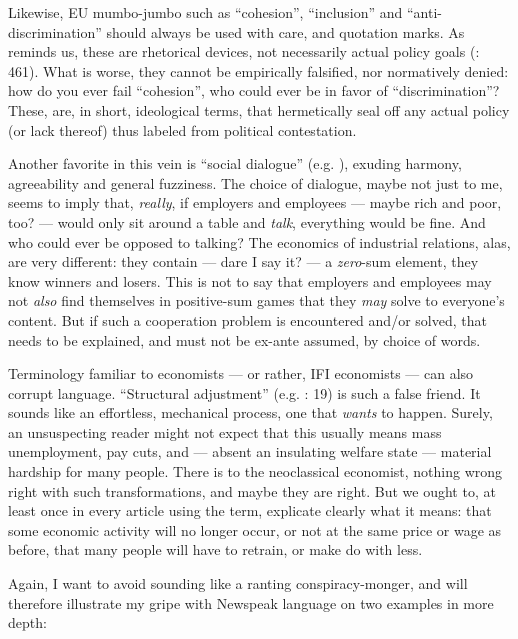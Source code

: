 \documentclass[11pt,a4paper,oneside,openright]{article}
\begin{document}
Likewise, \gls{EU} mumbo-jumbo such as ``cohesion'', ``inclusion'' and ``anti-discrimination'' should always be used with care, and quotation marks. 
As \citeauthor{Offe2003} reminds us, these are rhetorical devices, not necessarily actual policy goals (\citeyear{Offe2003}: 461). 
What is worse, they cannot be empirically falsified, nor normatively denied: 
how do you ever fail ``cohesion'', who could ever be in favor of ``discrimination''? 
These, are, in short, ideological terms, that hermetically seal off any actual policy (or lack thereof) thus labeled from political contestation.

Another favorite in this vein is ``social dialogue'' (e.g. \citealt{Durr2009}), exuding harmony, agreeability and general fuzziness. 
The choice of dialogue, maybe not just to me, seems to imply that, \emph{really}, if employers and employees --- maybe rich and poor, too? --- would only sit around a table and \emph{talk}, everything would be fine. 
And who could ever be opposed to talking? 
The economics of industrial relations, alas, are very different: 
they contain --- dare I say it? --- a \emph{zero}-sum element, they know winners and losers. 
This is not to say that employers and employees may not \emph{also} find themselves in positive-sum games that they \emph{may} solve to everyone's content. 
But if such a cooperation problem is encountered and/or solved, that needs to be explained, and must not be ex-ante assumed, by choice of words.

Terminology familiar to economists --- or rather, \gls{IFI} economists --- can also corrupt language. 
``Structural adjustment'' (e.g. \citealt{Begg2008}: 19) is such a false friend. 
It sounds like an effortless, mechanical process, one that \emph{wants} to happen. 
Surely, an unsuspecting reader might not expect that this usually means mass unemployment, pay cuts, and --- absent an insulating welfare state --- material hardship for many people. 
There is to the neoclassical economist, nothing wrong right with such transformations, and maybe they are right. 
But we ought to, at least once in every article using the term, explicate clearly what it means: 
that some economic activity will no longer occur, or not at the same price or wage as before, that many people will have to retrain, or make do with less.

Again, I want to avoid sounding like a ranting conspiracy-monger, and will therefore illustrate my gripe with Newspeak language on two examples in more depth:
\end{document}
